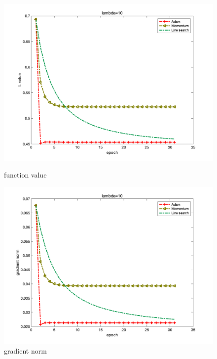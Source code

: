 \documentclass{article}
\begin{document}
\begin{figure}[H]
		\begin{minipage}{0.33\linewidth}
			\centering
			\includegraphics[width=1\linewidth]{./fig/fval_m1}
			\caption{function value}
		\end{minipage}
		\begin{minipage}{0.33\linewidth}
			\centering
			\includegraphics[width=1\linewidth]{./fig/gnorm_m1}
			\caption{gradient norm}
		\end{minipage}
		\begin{minipage}{0.33\linewidth}
			\centering

\end{minipage}
\end{figure}
\end{document}
